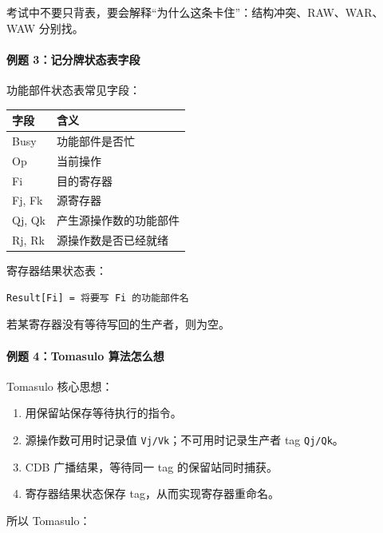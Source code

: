 \documentclass[
]{ctexart}
\newcommand{\passthrough}[1]{#1}
\newcounter{none} %
\providecommand{\tightlist}{%
  \setlength{\itemsep}{0pt}\setlength{\parskip}{0pt}}
\begin{document}
考试中不要只背表，要会解释``为什么这条卡住''：结构冲突、RAW、WAR、WAW
分别找。

\paragraph{例题
3：记分牌状态表字段}\label{ux4f8bux9898-3ux8bb0ux5206ux724cux72b6ux6001ux8868ux5b57ux6bb5}

功能部件状态表常见字段：

{\def\LTcaptype{none} %
\begin{longtable}[]{@{}ll@{}}
\toprule\noalign{}
字段 & 含义 \\
\midrule\noalign{}
\endhead
\bottomrule\noalign{}
\endlastfoot
Busy & 功能部件是否忙 \\
Op & 当前操作 \\
Fi & 目的寄存器 \\
Fj, Fk & 源寄存器 \\
Qj, Qk & 产生源操作数的功能部件 \\
Rj, Rk & 源操作数是否已经就绪 \\
\end{longtable}
}

寄存器结果状态表：

\begin{lstlisting}
Result[Fi] = 将要写 Fi 的功能部件名
\end{lstlisting}

若某寄存器没有等待写回的生产者，则为空。

\paragraph{例题 4：Tomasulo
算法怎么想}\label{ux4f8bux9898-4tomasulo-ux7b97ux6cd5ux600eux4e48ux60f3}

Tomasulo 核心思想：

\begin{enumerate}
\def\labelenumi{\arabic{enumi}.}
\tightlist
\item
  用保留站保存等待执行的指令。
\item
  源操作数可用时记录值
  \passthrough{\lstinline!Vj/Vk!}；不可用时记录生产者 tag
  \passthrough{\lstinline!Qj/Qk!}。
\item
  CDB 广播结果，等待同一 tag 的保留站同时捕获。
\item
  寄存器结果状态保存 tag，从而实现寄存器重命名。
\end{enumerate}

所以 Tomasulo：
\end{document}
